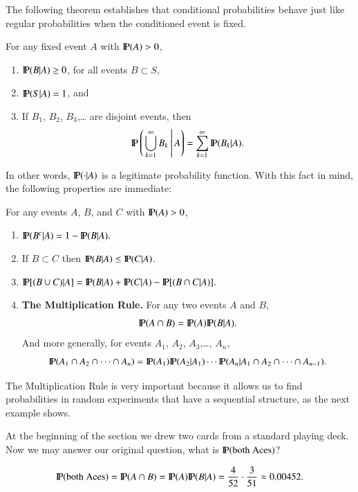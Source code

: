 \documentclass[captions=tableheading]{scrbook}
\begin{document}
The following theorem establishes that conditional probabilities behave just like regular probabilities when the conditioned event is fixed. 

\begin{thm}
For any fixed event \(A\) with \(\P(A)>0\),
\begin{enumerate}
\item \( \P (B|A)\geq 0 \), for all events \( B \subset S\),
\item \( \P (S|A) = 1 \), and
\item If \(B_{1}\), \(B_{2}\), \(B_{3}\),\ldots{} are disjoint events, then
  \begin{equation}
  \P\left(\left.\bigcup_{k=1}^{\infty}B_{k}\:\right|A\right)=\sum_{k=1}^{\infty}\P(B_{k}|A).
  \end{equation}
\end{enumerate}
\end{thm}
In other words, \(\P(\cdot|A)\) is a legitimate probability function. With this fact in mind, the following properties are immediate:

\begin{prop}
For any events \(A\), \(B\), and \(C\) with \(\P(A)>0\),

\begin{enumerate}
\item \( \P ( B^{c} | A ) = 1 - \P (B|A).\)
\item If \(B\subset C\) then \(\P(B|A)\leq\P(C|A)\).
\item \( \P [ ( B\cup C ) | A ] = \P (B|A) + \P(C|A) - \P [ (B \cap C|A) ].\)
\item \textbf{The Multiplication Rule.} For any two events \(A\) and \(B\),
  \begin{equation}
  \P(A\cap B)=\P(A)\P(B|A).\label{eq:multiplication-rule-short}
  \end{equation}
  And more generally, for events \(A_{1}\), \(A_{2}\), \(A_{3}\),\ldots{}, \(A_{n}\),
  \begin{equation}
  \P(A_{1}\cap A_{2}\cap\cdots\cap A_{n})=\P(A_{1})\P(A_{2}|A_{1})\cdots\P(A_{n}|A_{1}\cap A_{2}\cap\cdots\cap A_{n-1}).\label{eq:multiplication-rule-long}
  \end{equation}
\end{enumerate}
\end{prop}
The Multiplication Rule is very important because it allows us to find probabilities in random experiments that have a sequential structure, as the next example shows. 

\begin{example}
\label{exa:two-cards-both-aces}
At the beginning of the section we drew two cards from a standard playing deck. Now we may answer our original question, what is \(\P(\mbox{both Aces})\)?

\[
\P(\mbox{both Aces})=\P(A\cap B)=\P(A)\P(B|A)=\frac{4}{52}\cdot\frac{3}{51}\approx0.00452.
\]

\end{example}
\end{document}
